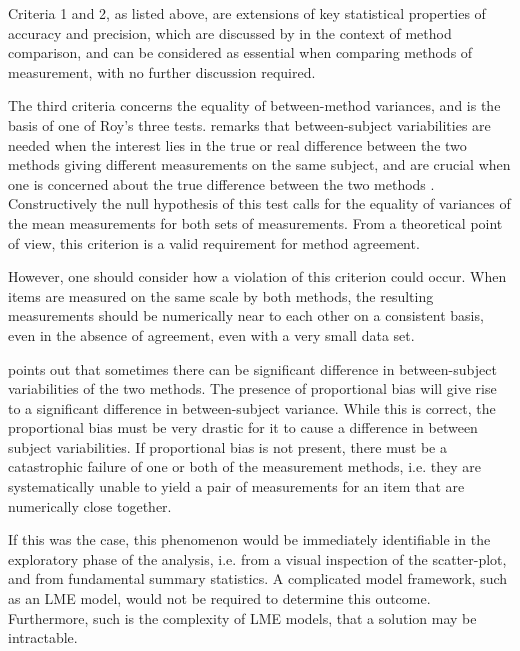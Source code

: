\documentclass[12pt, a4paper]{report}
\theoremstyle{plain}
\theoremstyle{definition}
\theoremstyle{remark}
\begin{document}
Criteria 1 and 2, as listed above, are extensions of key statistical properties of accuracy and precision, which are discussed by \citet{Barnhart} in the context of method comparison, and can be considered as essential when comparing methods of measurement, with no further discussion required.


The third criteria concerns the equality of between-method variances, and is the basis of one of Roy's three tests. \citet{ARoy2009} remarks that between-subject variabilities are needed when the interest lies in the true or real difference between the two methods giving different measurements on the same subject, and are crucial when one is concerned about the true difference between the two methods \citep{ARoy2009}. Constructively the null hypothesis of this test calls for the equality of variances of the mean measurements 
for both sets of measurements. From a theoretical point of view, this criterion is a valid requirement for method agreement. 

However, one should consider how a violation of this criterion could occur. When items are measured on the same scale by both methods, the resulting measurements should be numerically near to each other on a consistent basis, even in the absence of agreement, even with a very small data set. 

\citet{ARoy2009} points out that sometimes there can be significant difference in between-subject variabilities of the two methods. The presence of proportional bias will give rise to a significant difference in between-subject variance. While this is correct, the proportional bias must be very drastic for it to cause a difference in between subject variabilities. If proportional bias is not present, there must be a catastrophic failure of one or both of the measurement methods, i.e. they are systematically unable to yield a pair of measurements for an item that are numerically close together.

If this was the case, this phenomenon would be immediately identifiable in the exploratory phase of the analysis, i.e. from a visual inspection of the scatter-plot, and from fundamental summary statistics. A complicated model framework, such as an LME model, would not be required to determine this outcome. Furthermore, such is the complexity of LME models, that a solution may be intractable.
\end{document}
